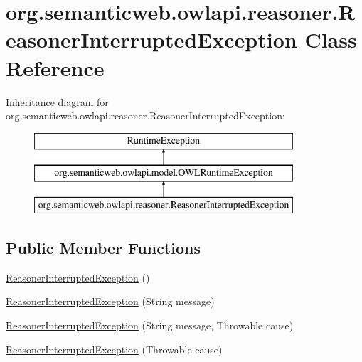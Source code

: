 \hypertarget{classorg_1_1semanticweb_1_1owlapi_1_1reasoner_1_1_reasoner_interrupted_exception}{\section{org.\-semanticweb.\-owlapi.\-reasoner.\-Reasoner\-Interrupted\-Exception Class Reference}
\label{classorg_1_1semanticweb_1_1owlapi_1_1reasoner_1_1_reasoner_interrupted_exception}
}
Inheritance diagram for org.\-semanticweb.\-owlapi.\-reasoner.\-Reasoner\-Interrupted\-Exception\-:\begin{figure}[H]
\begin{center}
\leavevmode
\includegraphics[height=3.000000cm]{classorg_1_1semanticweb_1_1owlapi_1_1reasoner_1_1_reasoner_interrupted_exception}
\end{center}
\end{figure}
\subsection*{Public Member Functions}
\begin{DoxyCompactItemize}
\item 
\hyperlink{classorg_1_1semanticweb_1_1owlapi_1_1reasoner_1_1_reasoner_interrupted_exception_a98ab46659d9b980aba7661ecb09c6f3e}{Reasoner\-Interrupted\-Exception} ()
\item 
\hyperlink{classorg_1_1semanticweb_1_1owlapi_1_1reasoner_1_1_reasoner_interrupted_exception_a042452544f22bc0846456d14a37d0390}{Reasoner\-Interrupted\-Exception} (String message)
\item 
\hyperlink{classorg_1_1semanticweb_1_1owlapi_1_1reasoner_1_1_reasoner_interrupted_exception_a6dec38b822b76f1a670729450bd44110}{Reasoner\-Interrupted\-Exception} (String message, Throwable cause)
\item 
\hyperlink{classorg_1_1semanticweb_1_1owlapi_1_1reasoner_1_1_reasoner_interrupted_exception_a7b4c7aa4cff3ed4439b7a9cc05793491}{Reasoner\-Interrupted\-Exception} (Throwable cause)
\end{DoxyCompactItemize}
